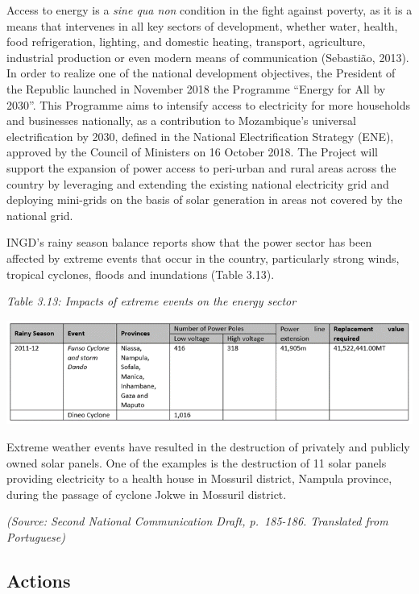 \documentclass[
]{book}
\begin{document}
Access to energy is a \emph{sine qua non} condition in the fight against poverty, as it is a means that intervenes in all key sectors of development, whether water, health, food refrigeration, lighting, and domestic heating, transport, agriculture, industrial production or even modern means of communication (Sebastião, 2013). In order to realize one of the national development objectives, the President of the Republic launched in November 2018 the Programme ``Energy for All by 2030''. This Programme aims to intensify access to electricity for more households and businesses nationally, as a contribution to Mozambique's universal electrification by 2030, defined in the National Electrification Strategy (ENE), approved by the Council of Ministers on 16 October 2018. The Project will support the expansion of power access to peri-urban and rural areas across the country by leveraging and extending the existing national electricity grid and deploying mini-grids on the basis of solar generation in areas not covered by the national grid.

INGD's rainy season balance reports show that the power sector has been affected by extreme events that occur in the country, particularly strong winds, tropical cyclones, floods and inundations (Table 3.13).

\emph{Table 3.13: Impacts of extreme events on the energy sector}

\includegraphics{Figure41.png}

Extreme weather events have resulted in the destruction of privately and publicly owned solar panels. One of the examples is the destruction of 11 solar panels providing electricity to a health house in Mossuril district, Nampula province, during the passage of cyclone Jokwe in Mossuril district.

\emph{(Source: Second National Communication Draft, p.~185-186. Translated from Portuguese)}

\hypertarget{actions-5}{%
\subsection{Actions}\label{actions-5}}
\end{document}

